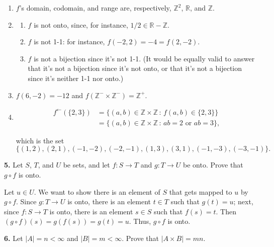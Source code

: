 \documentclass[10pt,]{book}
\theoremstyle{plain}
\theoremstyle{definition}
\theoremstyle{definition}
\theoremstyle{definition}
\theoremstyle{definition}
\numberwithin{equation}{section}
\def\Z{\mathbb{Z}}
\def\R{\mathbb{R}}
\newcommand{\lt}{ < }
\newcommand{\amp}{ & }
\begin{document}
\begin{enumerate}[label=(\alph*)]
\item\hypertarget{li-46}{}
        \(f\)'s domain, codomain, and range are, respectively, \(\Z^2\), \(\R\), and \(\Z\).
\item\hypertarget{li-47}{}%
\begin{enumerate}[label=\roman*.]
\item\hypertarget{li-48}{}
            \(f\) is not onto, since, for instance, \(1/2\in \R-\Z\).
\item\hypertarget{li-49}{}
            \(f\) is not 1-1: for instance, \(f(-2,2)=-4=f(2,-2)\).
\item\hypertarget{li-50}{}
            \(f\) is not a bijection since it's not 1-1. (It would be equally valid to answer that it's not a bijection since it's not onto, or that it's not a bijection since it's neither 1-1 nor onto.)
\end{enumerate}
%
\item\hypertarget{li-51}{}
        \(f(6,-2)=-12\) and \(f(\Z^-\times \Z^-)=\Z^+\).
\item\hypertarget{li-52}{}
\begin{align*}
f^{\leftarrow}(\{2,3\})\amp =\{(a,b)\in \Z\times \Z\,:\, f(a,b)\in \{2,3\}\}\\
\amp =\{(a,b)\in \Z\times \Z\,:\, ab=2 \mbox{ or }  ab=3\},
\end{align*}

        which is the set
\begin{equation*}

          \{(1,2),(2,1),(-1,-2),(-2,-1),(1,3),(3,1),(-1,-3),(-3,-1)\}.
        
\end{equation*}

\end{enumerate}
\par\smallskip
\noindent\textbf{5.}\quad{}
        Let \(S\), \(T\), and \(U\) be sets, and let \(f: S\to T\) and \(g: T\to U\) be onto. Prove that \(g \circ f\) is onto.
\par\smallskip

      Let \(u\in U\). We want to show there is an element of \(S\) that gets mapped to \(u\) by \(g\circ f\). Since \(g:T\to U\) is onto, there is an element \(t\in T\) such that \(g(t)=u\); next, since \(f:S\to T\) is onto, there is an element \(s\in S\) such that \(f(s)=t\). Then \((g\circ f)(s)=g(f(s))=g(t)=u\). Thus, \(g\circ f\) is onto.
\par\smallskip
\noindent\textbf{6.}\quad{}
        Let \(|A|=n\lt \infty\) and \(|B|=m\lt  \infty\). Prove that \(|A\times B|=mn\).
\par\smallskip
\end{document}
